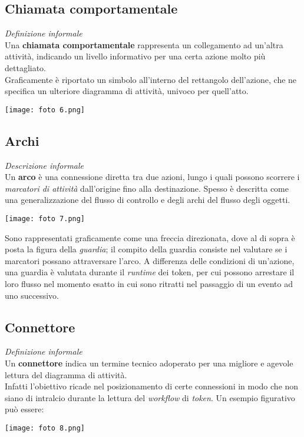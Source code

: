 \documentclass{article}
\begin{document}
\subsection*{Chiamata comportamentale}
\large
\textit{Definizione informale}\\Una \textbf{chiamata comportamentale} rappresenta un collegamento ad un'altra attività, indicando un livello informativo per una certa azione molto più dettagliato.\vspace*{14pt}\\
Graficamente è riportato un simbolo all'interno del rettangolo dell'azione, che ne specifica un ulteriore diagramma di attività, univoco per quell'atto.\\
\begin{center}
    \texttt{[image: foto 6.png]}
\end{center}

\subsection*{Archi}
\large
\textit{Descrizione informale}\\Un \textbf{arco} è una connessione diretta tra due azioni, lungo i quali possono scorrere i \textit{marcatori di attività} dall'origine fino alla destinazione. Spesso è descritta come una generalizzazione del flusso di controllo e degli archi del flusso degli oggetti.\\
\begin{center}
    \texttt{[image: foto 7.png]}
\end{center}
Sono rappresentati graficamente come una freccia direzionata, dove al di sopra è posta la figura della \textit{guardia}; il compito della guardia consiste nel valutare se i marcatori possano attraversare l'arco. A differenza delle condizioni di un'azione, una guardia è valutata durante il \textit{runtime} dei token, per cui possono arrestare il loro flusso nel momento esatto in cui sono ritratti nel passaggio di un evento ad uno successivo.

\subsection*{Connettore}
\textit{Definizione informale}\\Un \textbf{connettore} indica un termine tecnico adoperato per una migliore e agevole lettura del diagramma di attività.\vspace*{14pt}\\
Infatti l'obiettivo ricade nel posizionamento di certe connessioni in modo che non siano di intralcio durante la lettura del \textit{workflow} di \textit{token}. Un esempio figurativo può essere:\\
\begin{center}
    \texttt{[image: foto 8.png]}
\end{center}
\end{document}
